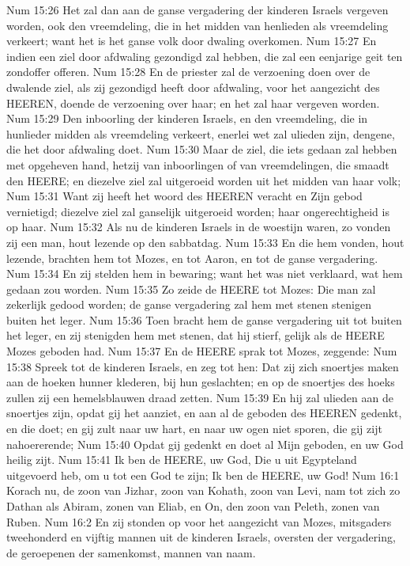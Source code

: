 Num 15:26  Het zal dan aan de ganse vergadering der kinderen Israels vergeven worden, ook den vreemdeling, die in het midden van henlieden als vreemdeling verkeert; want het is het ganse volk door dwaling overkomen.
Num 15:27  En indien een ziel door afdwaling gezondigd zal hebben, die zal een eenjarige geit ten zondoffer offeren.
Num 15:28  En de priester zal de verzoening doen over de dwalende ziel, als zij gezondigd heeft door afdwaling, voor het aangezicht des HEEREN, doende de verzoening over haar; en het zal haar vergeven worden.
Num 15:29  Den inboorling der kinderen Israels, en den vreemdeling, die in hunlieder midden als vreemdeling verkeert, enerlei wet zal ulieden zijn, dengene, die het door afdwaling doet.
Num 15:30  Maar de ziel, die iets gedaan zal hebben met opgeheven hand, hetzij van inboorlingen of van vreemdelingen, die smaadt den HEERE; en diezelve ziel zal uitgeroeid worden uit het midden van haar volk;
Num 15:31  Want zij heeft het woord des HEEREN veracht en Zijn gebod vernietigd; diezelve ziel zal ganselijk uitgeroeid worden; haar ongerechtigheid is op haar.
Num 15:32  Als nu de kinderen Israels in de woestijn waren, zo vonden zij een man, hout lezende op den sabbatdag.
Num 15:33  En die hem vonden, hout lezende, brachten hem tot Mozes, en tot Aaron, en tot de ganse vergadering.
Num 15:34  En zij stelden hem in bewaring; want het was niet verklaard, wat hem gedaan zou worden.
Num 15:35  Zo zeide de HEERE tot Mozes: Die man zal zekerlijk gedood worden; de ganse vergadering zal hem met stenen stenigen buiten het leger.
Num 15:36  Toen bracht hem de ganse vergadering uit tot buiten het leger, en zij stenigden hem met stenen, dat hij stierf, gelijk als de HEERE Mozes geboden had.
Num 15:37  En de HEERE sprak tot Mozes, zeggende:
Num 15:38  Spreek tot de kinderen Israels, en zeg tot hen: Dat zij zich snoertjes maken aan de hoeken hunner klederen, bij hun geslachten; en op de snoertjes des hoeks zullen zij een hemelsblauwen draad zetten.
Num 15:39  En hij zal ulieden aan de snoertjes zijn, opdat gij het aanziet, en aan al de geboden des HEEREN gedenkt, en die doet; en gij zult naar uw hart, en naar uw ogen niet sporen, die gij zijt nahoererende;
Num 15:40  Opdat gij gedenkt en doet al Mijn geboden, en uw God heilig zijt.
Num 15:41  Ik ben de HEERE, uw God, Die u uit Egypteland uitgevoerd heb, om u tot een God te zijn; Ik ben de HEERE, uw God!
Num 16:1  Korach nu, de zoon van Jizhar, zoon van Kohath, zoon van Levi, nam tot zich zo Dathan als Abiram, zonen van Eliab, en On, den zoon van Peleth, zonen van Ruben.
Num 16:2  En zij stonden op voor het aangezicht van Mozes, mitsgaders tweehonderd en vijftig mannen uit de kinderen Israels, oversten der vergadering, de geroepenen der samenkomst, mannen van naam.
